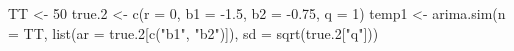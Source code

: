 \begin{Schunk}
\begin{Sinput}
 TT <- 50
 true.2 <- c(r = 0, b1 = -1.5, b2 = -0.75, q = 1)
 temp1 <- arima.sim(n = TT, list(ar = true.2[c("b1", "b2")]), sd = sqrt(true.2["q"]))
\end{Sinput}
\end{Schunk}
